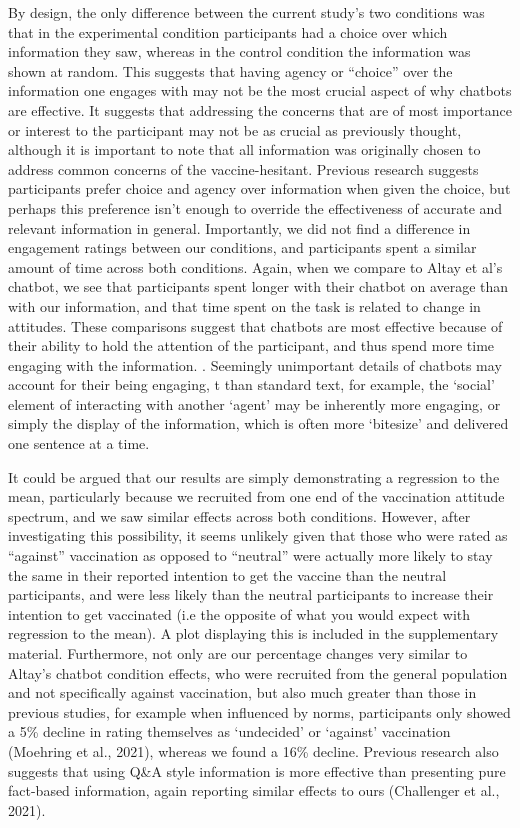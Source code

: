 \documentclass[
  english,
  ,jou,floatsintext]{apa6}
\begin{document}
By design, the only difference between the current study's two conditions was that in the experimental condition participants had a choice over which information they saw, whereas in the control condition the information was shown at random. This suggests that having agency or ``choice'' over the information one engages with may not be the most crucial aspect of why chatbots are effective. It suggests that addressing the concerns that are of most importance or interest to the participant may not be as crucial as previously thought, although it is important to note that all information was originally chosen to address common concerns of the vaccine-hesitant. Previous research suggests participants prefer choice and agency over information when given the choice, but perhaps this preference isn't enough to override the effectiveness of accurate and relevant information in general. Importantly, we did not find a difference in engagement ratings between our conditions, and participants spent a similar amount of time across both conditions. Again, when we compare to Altay et al's chatbot, we see that participants spent longer with their chatbot on average than with our information, and that time spent on the task is related to change in attitudes. These comparisons suggest that chatbots are most effective because of their ability to hold the attention of the participant, and thus spend more time engaging with the information. . Seemingly unimportant details of chatbots may account for their being engaging, t than standard text, for example, the `social' element of interacting with another `agent' may be inherently more engaging, or simply the display of the information, which is often more `bitesize' and delivered one sentence at a time.

It could be argued that our results are simply demonstrating a regression to the mean, particularly because we recruited from one end of the vaccination attitude spectrum, and we saw similar effects across both conditions. However, after investigating this possibility, it seems unlikely given that those who were rated as ``against'' vaccination as opposed to ``neutral'' were actually more likely to stay the same in their reported intention to get the vaccine than the neutral participants, and were less likely than the neutral participants to increase their intention to get vaccinated (i.e the opposite of what you would expect with regression to the mean). A plot displaying this is included in the supplementary material. Furthermore, not only are our percentage changes very similar to Altay's chatbot condition effects, who were recruited from the general population and not specifically against vaccination, but also much greater than those in previous studies, for example when influenced by norms, participants only showed a 5\% decline in rating themselves as `undecided' or `against' vaccination (Moehring et al., 2021), whereas we found a 16\% decline. Previous research also suggests that using Q\&A style information is more effective than presenting pure fact-based information, again reporting similar effects to ours (Challenger et al., 2021).
\end{document}
